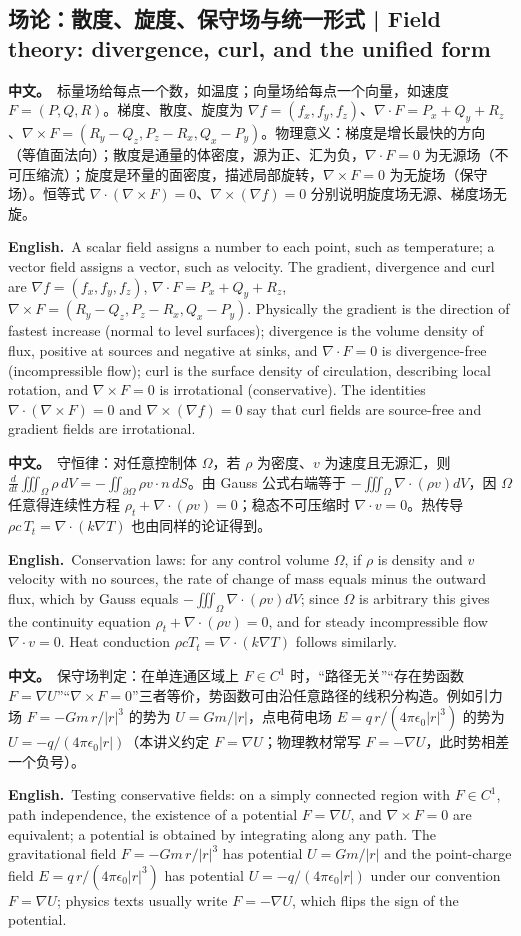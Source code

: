 \documentclass[UTF8,11pt,a4paper]{ctexart}
\newcommand{\BOTH}[2]{\par\noindent\textbf{中文。}\ #1\par\noindent\textbf{English.}\ #2\par}
\begin{document}
\subsection{场论：散度、旋度、保守场与统一形式 | Field theory: divergence, curl, and the unified form}
\BOTH{标量场给每点一个数，如温度；向量场给每点一个向量，如速度 $F=(P,Q,R)$。梯度、散度、旋度为 $\nabla f=(f_x,f_y,f_z)$、$\nabla\cdot F=P_x+Q_y+R_z$、$\nabla\times F=(R_y-Q_z,P_z-R_x,Q_x-P_y)$。物理意义：梯度是增长最快的方向（等值面法向）；散度是通量的体密度，源为正、汇为负，$\nabla\cdot F=0$ 为无源场（不可压缩流）；旋度是环量的面密度，描述局部旋转，$\nabla\times F=0$ 为无旋场（保守场）。恒等式 $\nabla\cdot(\nabla\times F)=0$、$\nabla\times(\nabla f)=0$ 分别说明旋度场无源、梯度场无旋。}{A scalar field assigns a number to each point, such as temperature; a vector field assigns a vector, such as velocity. The gradient, divergence and curl are $\nabla f=(f_x,f_y,f_z)$, $\nabla\cdot F=P_x+Q_y+R_z$, $\nabla\times F=(R_y-Q_z,P_z-R_x,Q_x-P_y)$. Physically the gradient is the direction of fastest increase (normal to level surfaces); divergence is the volume density of flux, positive at sources and negative at sinks, and $\nabla\cdot F=0$ is divergence-free (incompressible flow); curl is the surface density of circulation, describing local rotation, and $\nabla\times F=0$ is irrotational (conservative). The identities $\nabla\cdot(\nabla\times F)=0$ and $\nabla\times(\nabla f)=0$ say that curl fields are source-free and gradient fields are irrotational.}
\BOTH{守恒律：对任意控制体 $\Omega$，若 $\rho$ 为密度、$v$ 为速度且无源汇，则 $\frac{d}{dt}\iiint_\Omega\rho\,dV=-\iint_{\partial\Omega}\rho v\cdot n\,dS$。由 Gauss 公式右端等于 $-\iiint_\Omega\nabla\cdot(\rho v)dV$，因 $\Omega$ 任意得连续性方程 $\rho_t+\nabla\cdot(\rho v)=0$；稳态不可压缩时 $\nabla\cdot v=0$。热传导 $\rho c\,T_t=\nabla\cdot(k\nabla T)$ 也由同样的论证得到。}{Conservation laws: for any control volume $\Omega$, if $\rho$ is density and $v$ velocity with no sources, the rate of change of mass equals minus the outward flux, which by Gauss equals $-\iiint_\Omega\nabla\cdot(\rho v)dV$; since $\Omega$ is arbitrary this gives the continuity equation $\rho_t+\nabla\cdot(\rho v)=0$, and for steady incompressible flow $\nabla\cdot v=0$. Heat conduction $\rho cT_t=\nabla\cdot(k\nabla T)$ follows similarly.}
\BOTH{保守场判定：在单连通区域上 $F\in C^1$ 时，“路径无关”“存在势函数 $F=\nabla U$”“$\nabla\times F=0$”三者等价，势函数可由沿任意路径的线积分构造。例如引力场 $F=-Gm\,r/|r|^3$ 的势为 $U=Gm/|r|$，点电荷电场 $E=q\,r/(4\pi\epsilon_0|r|^3)$ 的势为 $U=-q/(4\pi\epsilon_0|r|)$（本讲义约定 $F=\nabla U$；物理教材常写 $F=-\nabla U$，此时势相差一个负号）。}{Testing conservative fields: on a simply connected region with $F\in C^1$, path independence, the existence of a potential $F=\nabla U$, and $\nabla\times F=0$ are equivalent; a potential is obtained by integrating along any path. The gravitational field $F=-Gm\,r/|r|^3$ has potential $U=Gm/|r|$ and the point-charge field $E=q\,r/(4\pi\epsilon_0|r|^3)$ has potential $U=-q/(4\pi\epsilon_0|r|)$ under our convention $F=\nabla U$; physics texts usually write $F=-\nabla U$, which flips the sign of the potential.}
\end{document}
